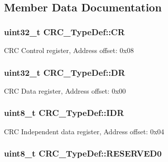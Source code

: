 \subsection{Member Data Documentation}
\hypertarget{struct_c_r_c___type_def_af33fa5c173e1c102e6d0242fe60e569f}{
\subsubsection[{C\-R}]{ uint32\-\_\-t C\-R\-C\-\_\-\-Type\-Def\-::\-C\-R}}\label{struct_c_r_c___type_def_af33fa5c173e1c102e6d0242fe60e569f}
C\-R\-C Control register, Address offset\-: 0x08 \hypertarget{struct_c_r_c___type_def_a50cb22870dbb9001241cec694994e5ef}{
\subsubsection[{D\-R}]{ uint32\-\_\-t C\-R\-C\-\_\-\-Type\-Def\-::\-D\-R}}\label{struct_c_r_c___type_def_a50cb22870dbb9001241cec694994e5ef}
C\-R\-C Data register, Address offset\-: 0x00 \hypertarget{struct_c_r_c___type_def_ad84e8694cd4b5375ee533c2d875c3b5a}{
\subsubsection[{I\-D\-R}]{ uint8\-\_\-t C\-R\-C\-\_\-\-Type\-Def\-::\-I\-D\-R}}\label{struct_c_r_c___type_def_ad84e8694cd4b5375ee533c2d875c3b5a}
C\-R\-C Independent data register, Address offset\-: 0x04 \hypertarget{struct_c_r_c___type_def_a70dfd1730dba65041550ef55a44db87c}{
\subsubsection[{R\-E\-S\-E\-R\-V\-E\-D0}]{\setlength{\rightskip}{0pt plus 5cm}uint8\-\_\-t C\-R\-C\-\_\-\-Type\-Def\-::\-R\-E\-S\-E\-R\-V\-E\-D0}}\label{struct_c_r_c___type_def_a70dfd1730dba65041550ef55a44db87c}
